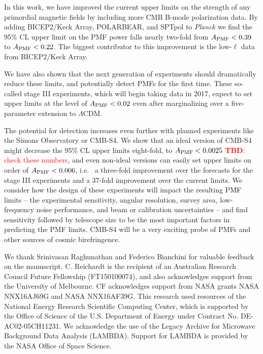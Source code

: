 \documentclass[apj]{emulateapj}
\newcommand{\apmf}{\ensuremath{A_{\rm PMF}}}
\newcommand{\lcdm}{\ensuremath{\Lambda}CDM}
\newcommand{\planck}{{\sl Planck}}
\newcommand{\bicepkeck}{BICEP2/Keck Array}
\newcommand{\pb}{POLARBEAR}
\newcommand{\sptpol}{SPTpol}
\newcommand{\tbd}[1]{\textcolor{Red}{{\bf TBD}: #1}}
\begin{document}
In this work, we have improved the current upper limits on the strength of any primordial magnetic fields by including more CMB B-mode polarization data. 
By adding \bicepkeck{}, \pb, and \sptpol{} to \planck{} we find the 95\% CL upper limit on the PMF power falls nearly two-fold from $\apmf < \upperAplk$ to $\apmf < \upperAall$. 
The biggest contributor to this improvement is the low-$\ell$ data from \bicepkeck{}. 

We have also shown that the next generation of experiments should dramatically reduce these limits, and potentially detect PMFs for the first time. 
These so-called stage III experiments, which will begin taking data in 2017, expect to set upper limits at the level of $\apmf < 0.02$ even after marginalizing over a five-parameter extension to \lcdm.

The potential for detection increases even further with planned experiments like the Simons Observatory or CMB-S4. 
We show that an ideal version of CMB-S4 might decrease the 95\% CL upper limits eight-fold, to $\apmf < 0.0025$ \tbd{check these numbers}, and even non-ideal versions can easily set upper limits on order of $\apmf < 0.006$, i.e.~ a three-fold improvement over the forecasts for the stage III experiments and a 37-fold improvement over the current limits. 
We consider how the design of these experiments will impact the resulting PMF limits -- the experimental sensitivity, angular resolution, survey area, low-frequency noise performance, and beam or calibration uncertainties -- and find sensitivity followed by telescope size to be the most important factors in predicting the PMF limits. 
CMB-S4 will be a very exciting probe of PMFs and other sources of cosmic birefringence. 

\acknowledgments

We thank Srinivasan Raghunathan and Federico Bianchini for valuable feedback on the manuscript. 
C. Reichardt is the recipient of an Australian Research Council Future Fellowship (FT150100074), and also acknowledges support from the University of Melbourne. 
CF acknowledges support from NASA grants NASA NNX16AJ69G and NASA NNX16AF39G. 
This research used resources of the National Energy Research Scientific Computing Center, which is supported by the Office of Science of the U.S. Department of Energy under Contract No. DE-AC02-05CH11231. 
We acknowledge the use of the Legacy Archive for Microwave Background Data Analysis (LAMBDA). Support for LAMBDA is provided by the NASA Office of Space Science.



\end{document}
